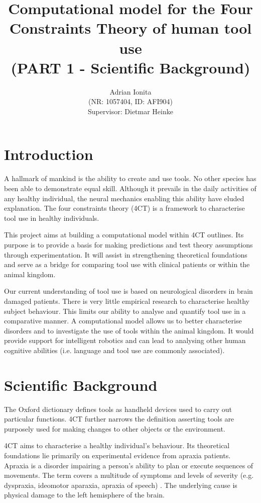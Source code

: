 \documentclass[11]{article}
\title{
  Computational model for the Four Constraints Theory of human tool use\\  
  \setlength{\parskip}{0.5em}  
  \normalsize (PART 1 - Scientific Background)
  }
\date{}
\author{Adrian Ionita\\
\small{(NR: 1057404, ID: AFI904)}\\
Supervisor: Dietmar Heinke}
\begin{document}
\maketitle 	

\section{Introduction} 

A hallmark of mankind is the ability to create and use tools.
No other species has been able to demonstrate equal skill. 
Although it prevails in the daily activities of any healthy individual, the neural mechanics enabling this ability have eluded explanation. The four constraints theory (4CT) is a framework to characterise tool use\cite{osiurak2014} in healthy individuals.

This project aims at building a computational model within 4CT outlines. Its purpose is to provide a basis for making predictions and test theory assumptions through experimentation. It will assist in strengthening theoretical foundations and serve as a bridge for comparing tool use with clinical patients or within the animal kingdom.

Our current understanding of tool use is based on neurological disorders in brain damaged patients. There is very little empirical research to characterise healthy subject behaviour. This limits our ability to analyse and quantify tool use in a comparative manner. A computational model allows us to better characterise disorders and to investigate the use of tools within the animal kingdom. It would provide support for intelligent robotics and can lead to analysing other human cognitive abilities (i.e. language and tool use are commonly associated\cite{osiurak2014}\cite{fitch2010}).

\section{Scientific Background}
The Oxford dictionary defines tools as handheld devices used to carry out particular functions\cite{oxford}. 4CT further narrows the definition asserting tools are purposely used for making changes to other objects or the environment. 

4CT aims to characterise a healthy individual's behaviour. Its theoretical foundations lie primarily on experimental evidence from apraxia patients. Apraxia is a disorder impairing a person's ability to plan or execute sequences of movements. The term covers a multitude of symptoms and levels of severity (e.g. dyspraxia, ideomotor aparaxia, apraxia of speech) . The underlying cause is physical damage to the left hemisphere of the brain\cite{osiurak2013}.
\end{document}
